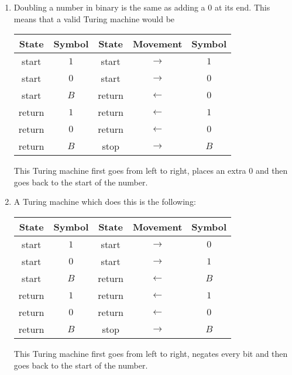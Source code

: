 \begin{solution}
\begin{enumerate}
	\item Doubling a number in binary is the same
	as adding a \(0\) at its end.
	This means that a valid Turing machine would be
	\begin{center}
	\begin{tabular}{|c|c||c|c|c|}
	\hline
	\textbf{State} & \textbf{Symbol} & \textbf{State} & \textbf{Movement} & \textbf{Symbol} \\
	\hline
	start & $1$ & start & $\to$ & $1$ \\
	\hline
	start & $0$ & start & $\to$ & $0$ \\
	\hline
	start & $B$ & return & $\leftarrow$ & $0$ \\
	\hline
	return & $1$ & return & $\leftarrow$ & $1$ \\
	\hline
	return & $0$ & return & $\leftarrow$ & $0$ \\
	\hline
	return & $B$ & stop & $\to$ & $B$ \\
	\hline
	\end{tabular}
	\end{center}
	This Turing machine first goes from left to right, places an extra \(0\)
	and then goes back to the start of the number.
	\item A Turing machine which does this is the following:
	\begin{center}
	\begin{tabular}{|c|c||c|c|c|}
	\hline
	\textbf{State} & \textbf{Symbol} & \textbf{State} & \textbf{Movement} & \textbf{Symbol} \\
	\hline
	start & $1$ & start & $\to$ & $0$ \\
	\hline
	start & $0$ & start & $\to$ & $1$ \\
	\hline
	start & $B$ & return & $\leftarrow$ & $B$ \\
	\hline
	return & $1$ & return & $\leftarrow$ & $1$ \\
	\hline
	return & $0$ & return & $\leftarrow$ & $0$ \\
	\hline
	return & $B$ & stop & $\to$ & $B$ \\
	\hline
	\end{tabular}
	\end{center}
	This Turing machine first goes from left to right, negates every bit
	and then goes back to the start of the number.
\end{enumerate}
\end{solution}

